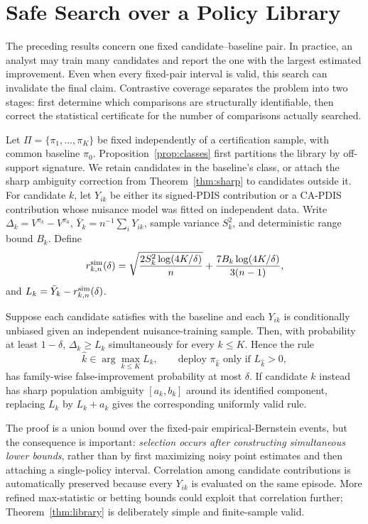 \section{Safe Search over a Policy Library}

The preceding results concern one fixed candidate--baseline pair. In practice, an analyst may train many candidates and report the one with the largest estimated improvement. Even when every fixed-pair interval is valid, this search can invalidate the final claim. Contrastive coverage separates the problem into two stages: first determine which comparisons are structurally identifiable, then correct the statistical certificate for the number of comparisons actually searched.

Let $\Pi=\{\pi_1,\ldots,\pi_K\}$ be fixed independently of a certification sample, with common baseline $\pi_0$. Proposition~\ref{prop:classes} first partitions the library by off-support signature. We retain candidates in the baseline's class, or attach the sharp ambiguity correction from Theorem~\ref{thm:sharp} to candidates outside it. For candidate $k$, let $Y_{ik}$ be either its signed-PDIS contribution or a CA-PDIS contribution whose nuisance model was fitted on independent data. Write $\Delta_k=V^{\pi_k}-V^{\pi_0}$, $\bar Y_k=n^{-1}\sum_iY_{ik}$, sample variance $S_k^2$, and deterministic range bound $B_k$. Define
\begin{equation}
 r_{k,n}^{\rm sim}(\delta)=
 \sqrt{\frac{2S_k^2\log(4K/\delta)}{n}}
 +\frac{7B_k\log(4K/\delta)}{3(n-1)},
\label{eq:simradius}
\end{equation}
and $L_k=\bar Y_k-r_{k,n}^{\rm sim}(\delta)$.

\begin{theorem}
\label{thm:library}
Suppose each candidate satisfies \UCC with the baseline and each $Y_{ik}$ is conditionally unbiased given an independent nuisance-training sample. Then, with probability at least $1-\delta$, $\Delta_k\ge L_k$ simultaneously for every $k\le K$. Hence the rule
\[
\widehat k\in\arg\max_{k\le K}L_k,
\qquad
\text{deploy }\pi_{\widehat k}\text{ only if }L_{\widehat k}>0,
\]
has family-wise false-improvement probability at most $\delta$. If candidate $k$ instead has sharp population ambiguity $[a_k,b_k]$ around its identified component, replacing $L_k$ by $L_k+a_k$ gives the corresponding uniformly valid rule.
\end{theorem}

The proof is a union bound over the fixed-pair empirical-Bernstein events, but the consequence is important: \emph{selection occurs after constructing simultaneous lower bounds}, rather than by first maximizing noisy point estimates and then attaching a single-policy interval. Correlation among candidate contributions is automatically preserved because every $Y_{ik}$ is evaluated on the same episode. More refined max-statistic or betting bounds could exploit that correlation further; Theorem~\ref{thm:library} is deliberately simple and finite-sample valid.

